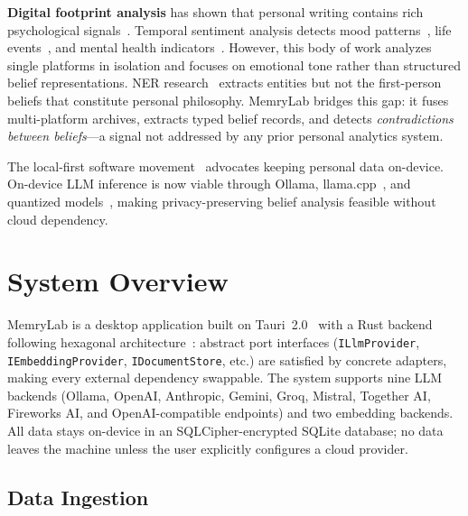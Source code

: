 \documentclass[conference]{IEEEtran}
\begin{document}
\textbf{Digital footprint analysis} has shown that personal writing contains rich psychological signals~\cite{kosinski2013private,youyou2015computer}. Temporal sentiment analysis detects mood patterns~\cite{thelwall2012sentiment,golder2011diurnal}, life events~\cite{li2014major}, and mental health indicators~\cite{de2013social}. However, this body of work analyzes single platforms in isolation and focuses on emotional tone rather than structured belief representations. NER research~\cite{li2020survey,yadav2018ner} extracts entities but not the first-person beliefs that constitute personal philosophy. MemryLab bridges this gap: it fuses multi-platform archives, extracts typed belief records, and detects \emph{contradictions between beliefs}---a signal not addressed by any prior personal analytics system.

The local-first software movement~\cite{kleppmann2019localfirst} advocates keeping personal data on-device. On-device LLM inference is now viable through Ollama, llama.cpp~\cite{gerganov2023llamacpp}, and quantized models~\cite{dettmers2023qlora}, making privacy-preserving belief analysis feasible without cloud dependency.

\section{System Overview}
\label{sec:architecture}

MemryLab is a desktop application built on Tauri~2.0~\cite{thompson2024tauri} with a Rust backend following hexagonal architecture~\cite{cockburn2005hexagonal}: abstract port interfaces (\texttt{ILlmProvider}, \texttt{IEmbeddingProvider}, \texttt{IDocumentStore}, etc.) are satisfied by concrete adapters, making every external dependency swappable. The system supports nine LLM backends (Ollama, OpenAI, Anthropic, Gemini, Groq, Mistral, Together AI, Fireworks AI, and OpenAI-compatible endpoints) and two embedding backends. All data stays on-device in an SQLCipher-encrypted SQLite database; no data leaves the machine unless the user explicitly configures a cloud provider.

\subsection{Data Ingestion}
\end{document}
